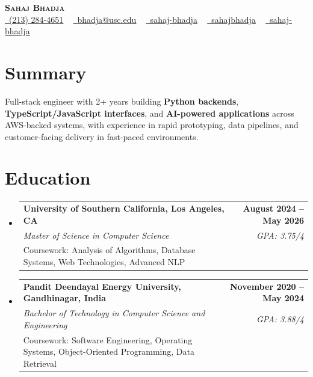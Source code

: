 \documentclass[letterpaper,10pt]{article}
\makeatletter
\newcommand{\resumeEduSubheading}[5]{\vspace{-1pt}\item\begin{tabular*}{1.0\textwidth}[t]{l@{\extracolsep{\fill}}r}\textbf{#1} & \textbf{\small #2} \\\textit{\small #3} & \textit{\small #4} \\\small #5 & \\\end{tabular*}\vspace{-4pt}}
\newcommand{\resumeSubHeadingListStart}{\begin{itemize}[leftmargin=0.0in, label={}]}
\newcommand{\resumeSubHeadingListEnd}{\end{itemize}}
\makeatother
\begin{document}
\begin{center}
{\Huge \scshape \textbf{Sahaj Bhadja}} \\ \vspace{1pt}
\small \href{tel:(213) 284-4651}{\faPhone\ \underline{(213) 284-4651}} ~ \href{mailto: bhadja@usc.edu}{\raisebox{-0.2\height}\faEnvelope\ \underline{bhadja@usc.edu}} ~
\href{https://www.linkedin.com/in/sahaj-bhadja/}{\raisebox{-0.2\height}\faLinkedin\ \underline{sahaj-bhadja}} ~ \href{https://github.com/SAHAJ-BHADJA}{\raisebox{-0.2\height}\faGithub\ \underline{sahajbhadja}} ~
\href{https://sahaj-bhadja.vercel.app/}{\raisebox{-0.2\height}\faGlobe\ \underline{sahaj-bhadja}}
\end{center}
\vspace{-18pt}
\section{Summary}
\begin{itemize}[leftmargin=0.15in, label={}]
\small{\item{Full-stack engineer with 2+ years building \textbf{Python backends}, \textbf{TypeScript/JavaScript interfaces}, and \textbf{AI-powered applications} across AWS-backed systems, with experience in rapid prototyping, data pipelines, and customer-facing delivery in fast-paced environments.}}
\end{itemize}
\vspace{-16pt}
\section{Education}
\resumeSubHeadingListStart
\resumeEduSubheading{University of Southern California, Los Angeles, CA}{August 2024 -- May 2026}{Master of Science in Computer Science}{GPA: 3.75/4}{Coursework: Analysis of Algorithms, Database Systems, Web Technologies, Advanced NLP}
\vspace{-9pt}
\resumeEduSubheading{Pandit Deendayal Energy University, Gandhinagar, India}{November 2020 -- May 2024}{Bachelor of Technology in Computer Science and Engineering}{GPA: 3.88/4}{Coursework: Software Engineering, Operating Systems, Object-Oriented Programming, Data Retrieval}
\resumeSubHeadingListEnd
\vspace{-14pt}
\end{document}
